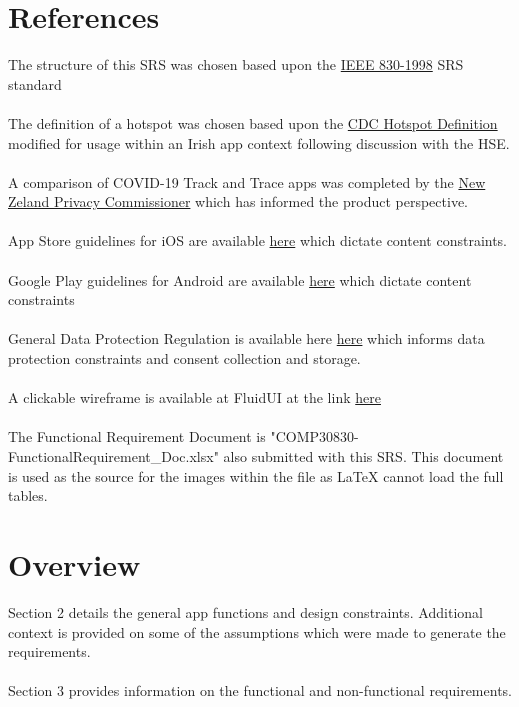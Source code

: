\documentclass{scrreprt}
\begin{document}
\section{References}\label{References}
The structure of this SRS was chosen based upon the \href{https://standards.ieee.org/standard/830-1998.html}{IEEE 830-1998} SRS standard\\
\\
The definition of a hotspot was chosen based upon the 
\href{https://www.cdc.gov/mmwr/volumes/69/wr/mm6933e2.htm}{CDC Hotspot Definition} modified for usage within an Irish app context following discussion with the HSE.\\
\\
A comparison of COVID-19 Track and Trace apps was completed by the \href{https://privacy.org.nz/assets/2020-05-12-OPC-Comparison-of-COVID-19-Apps-colours.pdf}{New Zeland Privacy Commissioner} which has informed the product perspective.\\
\\
App Store guidelines for iOS are available \href{https://developer.apple.com/app-store/review/guidelines/}{here} which dictate content constraints.\\
\\
Google Play guidelines for Android are available \href{https://play.google.com/about/developer-content-policy/}{here} which dictate content constraints\\
\\
General Data Protection Regulation is available here \href{https://gdpr-info.eu}{here} which informs data protection constraints and consent collection and storage.\\
\\
A clickable wireframe is available at FluidUI at the link \href{https://www.fluidui.com/editor/live/project/p_5m9EtaKvry2LGyTzKWLHsE64PqSvu3rX}{here}\\
\\
The Functional Requirement Document is "COMP30830-FunctionalRequirement\_Doc.xlsx" also submitted with this SRS. This document is used as the source for the images within the file as LaTeX cannot load the full tables.

\section{Overview}\label{Overview}
Section 2 details the general app functions and design constraints. Additional context is provided on some of the assumptions which were made to generate the requirements.\\
\\
Section 3 provides information on the functional and non-functional requirements.
\end{document}
